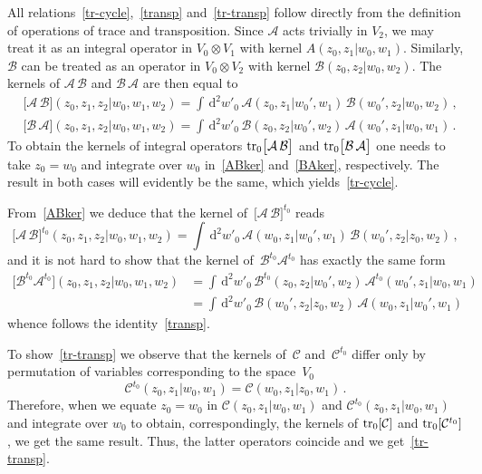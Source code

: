 \documentclass[a4paper,11pt]{article}
\newcommand{\tr}{\mathop{\rm tr}\nolimits}
\numberwithin{equation}{section}
\begin{document}
All relations~\eqref{tr-cycle},~\eqref{transp} and~\eqref{tr-transp} follow directly from the definition of operations of trace and transposition.
Since $\mathcal{A}$ acts trivially in $V_2$, we may treat it as an integral operator in $V_0\otimes V_1$ with kernel $A(z_0,z_1|w_0,w_1)$.
Similarly, $\mathcal{B}$ can be treated as an operator in $V_0\otimes V_2$ with kernel $\mathcal{B}(z_0,z_2|w_0,w_2)$.
The kernels of $\mathcal{A}\,\mathcal{B}$ and $\mathcal{B}\,\mathcal{A}$ are then equal to
\begin{align}
	& \label{ABker}
	\bigl[\mathcal{A}\,\mathcal{B}\bigr](z_0,z_1,z_2|w_0,w_1,w_2) = \int\,\mathrm{d}^2w'_0 \, \mathcal{A}(z_0,z_1|w_0',w_1)\,\mathcal{B}(w_0',z_2|w_0,w_2) \,, \\
	& \label{BAker}
	\bigl[\mathcal{B}\,\mathcal{A}\bigr](z_0,z_1,z_2|w_0,w_1,w_2) = \int\,\mathrm{d}^2w'_0 \, \mathcal{B}(z_0,z_2|w_0',w_2) \, \mathcal{A}(w_0',z_1|w_0,w_1) \,.
\end{align}
To obtain the kernels of integral operators $\tr_0\bigl[\mathcal{A}\,\mathcal{B}\bigr]$ and $\tr_0\bigl[\mathcal{B}\,\mathcal{A}\bigr]$ one needs to take $z_0=w_0$ and integrate over $w_0$ in~\eqref{ABker} and~\eqref{BAker}, respectively.
The result in both cases will evidently be the same, which yields~\eqref{tr-cycle}.

From~\eqref{ABker} we deduce that the kernel of~$\bigl[\mathcal{A}\,\mathcal{B}\bigr]^{t_0}$ reads
\begin{equation} \nonumber
	\bigl[\mathcal{A}\,\mathcal{B}\bigr]^{t_0}(z_0,z_1,z_2|w_0,w_1,w_2) = \int\,\mathrm{d}^2w'_0 \, \mathcal{A}(w_0,z_1|w_0',w_1)\,\mathcal{B}(w_0',z_2|z_0,w_2) \,,
\end{equation}
and it is not hard to show that the kernel of~$\mathcal{B}^{t_0} \mathcal{A}^{t_0}$ has exactly the same form
\begin{align}
	\nonumber
	\bigl[\mathcal{B}^{t_0}\mathcal{A}^{t_0}\bigr](z_0,z_1,z_2|w_0,w_1,w_2) 
	& = \int\,\mathrm{d}^2w'_0 \, \mathcal{B}^{t_0}(z_0,z_2|w_0',w_2) \, \mathcal{A}^{t_0}(w_0',z_1|w_0,w_1) \\
	\nonumber
	& = \int\,\mathrm{d}^2w'_0 \, \mathcal{B}(w_0',z_2|z_0,w_2) \, \mathcal{A}(w_0,z_1|w_0',w_1)
\end{align}
whence follows the identity~\eqref{transp}.

To show~\eqref{tr-transp} we observe that the kernels of~$\mathcal{C}$ and~$\mathcal{C}^{t_0}$ differ only by permutation of variables corresponding to the space~$V_0$
\begin{equation} \nonumber
	\mathcal{C}^{t_0}(z_0,z_1|w_0,w_1) = \mathcal{C}(w_0,z_1|z_0,w_1) \,.
\end{equation}
Therefore, when we equate $z_0=w_0$ in $\mathcal{C}(z_0,z_1|w_0,w_1)$ and $\mathcal{C}^{t_0}(z_0,z_1|w_0,w_1)$ and integrate over $w_0$ to obtain, correspondingly, the kernels of $\tr_0[\mathcal{C}]$ and $\tr_0[\mathcal{C}^{t_0}]$, we get the same result. Thus, the latter operators coincide and we get~\eqref{tr-transp}.
\end{document}
